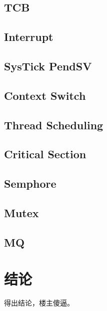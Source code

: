 \section{TCB}
\section{Interrupt}
\section{SysTick  PendSV}
\section{Context Switch}
\section{Thread Scheduling}

\section{Critical Section}
\section{Semphore}
\section{Mutex}
\section{MQ}




\chapter*{结\quad 论}

得出结论，楼主傻逼。
